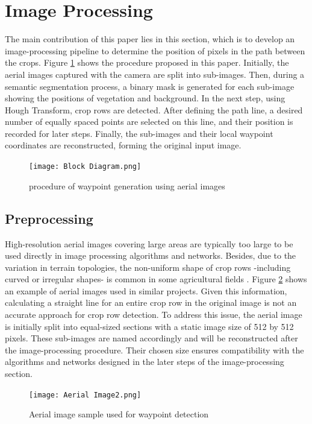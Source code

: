 \documentclass[conference]{IEEEtran}
\begin{document}
\section{Image Processing}\label{Image Processing}
The main contribution of this paper lies in this section, which is to develop an image-processing pipeline to determine the position of pixels in the path between the crops. Figure
\ref{fig_procedure}
shows the procedure proposed in this paper. Initially, the aerial images captured with the camera are split into sub-images. Then, during a semantic segmentation process, a binary mask is generated for each sub-image showing the positions of vegetation and background. In the next step, using Hough Transform, crop rows are detected. After defining the path line, a desired number of equally spaced points are selected on this line, and their position is recorded for later steps. Finally, the sub-images and their local waypoint coordinates are reconstructed, forming the original input image.

\begin{figure}[htbp]
\texttt{[image: Block Diagram.png]}
\caption{procedure of waypoint generation using aerial images
\cite{b5}}
\label{fig_procedure}
\end{figure}

\subsection{Preprocessing}\label{Preprocessing}
High-resolution aerial images covering large areas are typically too large to be used directly in image processing algorithms and networks.
Besides, due to the variation in terrain topologies, the non-uniform shape of crop rows -including curved or irregular shapes- is common in some agricultural fields
\cite{b2, b3, b14}.
Figure \ref{fig_Aerial} shows an example of aerial images used in similar projects.
Given this information, calculating a straight line for an entire crop row in the original image is not an accurate approach for crop row detection.
To address this issue, the aerial image is initially split into equal-sized sections with a static image size of 512 by 512 pixels. These sub-images are named accordingly and will be reconstructed after the image-processing procedure. Their chosen size ensures compatibility with the algorithms and networks designed in the later steps of the image-processing section.


\begin{figure}[htbp]
\texttt{[image: Aerial Image2.png]}
\caption{Aerial image sample used for waypoint detection
\cite{b5}}
\label{fig_Aerial}
\end{figure}
\end{document}

